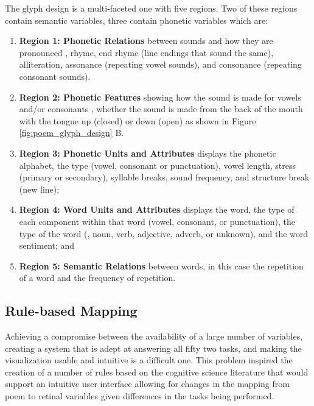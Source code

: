 The glyph design is a multi-faceted one with five regions. Two of these regions contain semantic variables, three contain phonetic variables which are:
\begin{enumerate}
\item \textbf{Region 1: Phonetic Relations} between sounds and how they are pronounced \eg, rhyme, end rhyme (line endings that sound the same), alliteration, assonance (repeating vowel sounds), and consonance (repeating consonant sounds). 
\vspace{-2mm}
\item \textbf{Region 2: Phonetic Features} showing how the sound is made for vowels and/or consonants \eg, whether the sound is made from the back of the mouth with the tongue up (closed) or down (open) as shown in Figure \ref{fig:poem_glyph_design} B.
\vspace{-2mm}
\item \textbf{Region 3: Phonetic Units and Attributes} displays the phonetic alphabet, the type (vowel, consonant or punctuation), vowel length, stress (primary or secondary), syllable breaks, sound frequency, and structure break (new line);
\vspace{-2mm}
\item \textbf{Region 4: Word Units and Attributes} displays the word, the type of each component within that word (vowel, consonant, or punctuation), the type of the word (\eg, noun, verb, adjective, adverb, or unknown), and the word sentiment; and
\vspace{-2mm}
\item \textbf{Region 5: Semantic Relations} between words, in this case the repetition of a word and the frequency of repetition.
\end{enumerate}



\subsection{Rule-based Mapping}
Achieving a compromise between the availability of a large number of variables, creating a system that is adept at answering all fifty two tasks, and making the visualization usable and intuitive is a difficult one. 
This problem inspired the creation of a number of rules based on the cognitive science literature that would support an intuitive user interface allowing for changes in the mapping from poem to retinal variables given differences in the tasks being performed.


